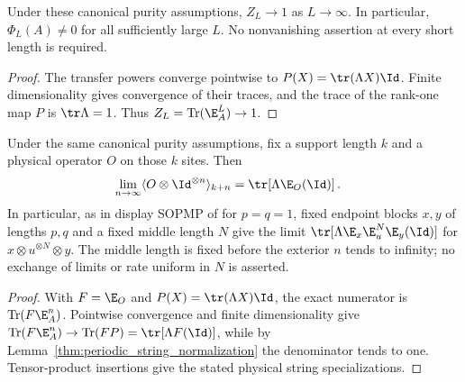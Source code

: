 \begin{lemma}
    \label{thm:periodic_string_normalization}
    \leanok
    Under these canonical purity assumptions, $Z_L\to1$ as $L\to\infty$.
    In particular, $\Phi_L(A)\ne0$ for all sufficiently large $L$.
    No nonvanishing assertion at every short length is required.
\end{lemma}
\begin{proof}
    \leanok
    The transfer powers converge pointwise to $P(X)=\tr(\Lambda X)\Id$.
    Finite dimensionality gives convergence of their traces, and the trace
    of the rank-one map $P$ is $\tr\Lambda=1$. Thus
    $Z_L=\operatorname{Tr}(\E_A^L)\to1$.
\end{proof}

\begin{lemma}
    \label{thm:periodic_string_fixed_support}
    \leanok
    Under the same canonical purity assumptions, fix a support length $k$
    and a physical operator $O$ on those $k$ sites. Then
    \begin{align}
        \lim_{n\to\infty}\langle O\otimes\Id^{\otimes n}\rangle_{k+n}
         & =\tr\!\left[\Lambda\E_O(\Id)\right].
        \label{eq:periodic_string_fixed_support}
    \end{align}
    In particular, as in display SOPMP of
    \cite[lines~176--181]{PerezGarcia2008StringOrder} for $p=q=1$, fixed
    endpoint blocks $x,y$ of lengths $p,q$ and a fixed middle length $N$
    give the limit $\tr[\Lambda\E_x\E_u^N\E_y(\Id)]$ for
    $x\otimes u^{\otimes N}\otimes y$.
    The middle length is fixed before the exterior $n$ tends to infinity;
    no exchange of limits or rate uniform in $N$ is asserted.
\end{lemma}
\begin{proof}
    \leanok
    With $F=\E_O$ and $P(X)=\tr(\Lambda X)\Id$, the exact numerator is
    $\operatorname{Tr}(F\E_A^n)$. Pointwise convergence and finite
    dimensionality give
    $\operatorname{Tr}(F\E_A^n)\to\operatorname{Tr}(FP)
        =\tr[\Lambda F(\Id)]$, while by
    Lemma~\ref{thm:periodic_string_normalization} the denominator tends to
    one. Tensor-product insertions give the stated physical string
    specializations.
\end{proof}

